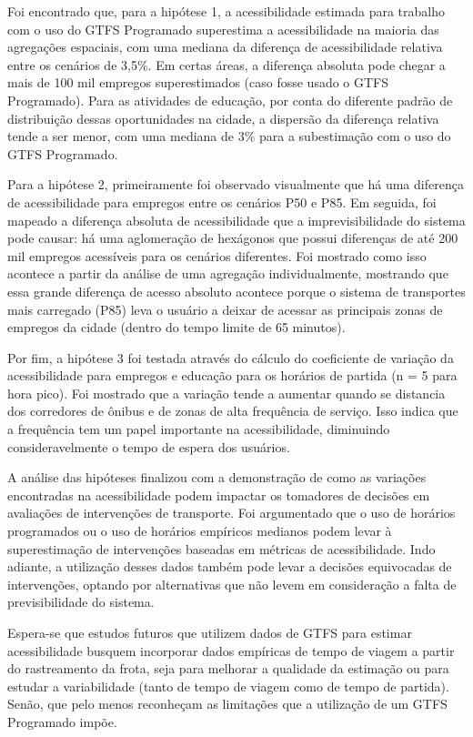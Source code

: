 \documentclass[        
    a4paper,          %
    12pt,             %
    chapter=TITLE,    %
    section=Title,    %
    subsection=Title, %
    oneside,          %
    english,          %
    spanish,          %
    brazil,           %
    fleqn             %
]{abntex2}
\begin{document}
  Foi encontrado que, para a hipótese 1, a acessibilidade estimada para trabalho com o uso do GTFS Programado superestima a acessibilidade na maioria das agregações espaciais, com uma mediana da diferença de acessibilidade relativa entre os cenários de 3,5\%. Em certas áreas, a diferença absoluta pode chegar a mais de 100 mil empregos superestimados (caso fosse usado o GTFS Programado). Para as atividades de educação, por conta do diferente padrão de distribuição dessas oportunidades na cidade, a dispersão da diferença relativa tende a ser menor, com uma mediana de 3\% para a subestimação com o uso do GTFS Programado.
  
  Para a hipótese 2, primeiramente foi observado visualmente que há uma diferença de acessibilidade para empregos entre os cenários P50 e P85. Em seguida, foi mapeado a diferença absoluta de acessibilidade que a imprevisibilidade do sistema pode causar: há uma aglomeração de hexágonos que possui diferenças de até 200 mil empregos acessíveis para os cenários diferentes. Foi mostrado como isso acontece a partir da análise de uma agregação individualmente, mostrando que essa grande diferença de acesso absoluto acontece porque o sistema de transportes mais carregado (P85) leva o usuário a deixar de acessar as principais zonas de empregos da cidade (dentro do tempo limite de 65 minutos).
  
  Por fim, a hipótese 3 foi testada através do cálculo do coeficiente de variação da acessibilidade para empregos e educação para os horários de partida (n = 5 para hora pico). Foi mostrado que a variação tende a aumentar quando se distancia dos corredores de ônibus e de zonas de alta frequência de serviço. Isso indica que a frequência tem um papel importante na acessibilidade, diminuindo consideravelmente o tempo de espera dos usuários.
  
  A análise das hipóteses finalizou com a demonstração de como as variações encontradas na acessibilidade podem impactar os tomadores de decisões em avaliações de intervenções de transporte. Foi argumentado que o uso de horários programados ou o uso de horários empíricos medianos podem levar à superestimação de intervenções baseadas em métricas de acessibilidade. Indo adiante, a utilização desses dados também pode levar a decisões equivocadas de intervenções, optando por alternativas que não levem em consideração a falta de previsibilidade do sistema.
  
  Espera-se que estudos futuros que utilizem dados de GTFS para estimar acessibilidade busquem incorporar dados empíricas de tempo de viagem a partir do rastreamento da frota, seja para melhorar a qualidade da estimação ou para estudar a variabilidade (tanto de tempo de viagem como de tempo de partida). Senão, que pelo menos reconheçam as limitações que a utilização de um GTFS Programado impõe.
  
\end{document}

